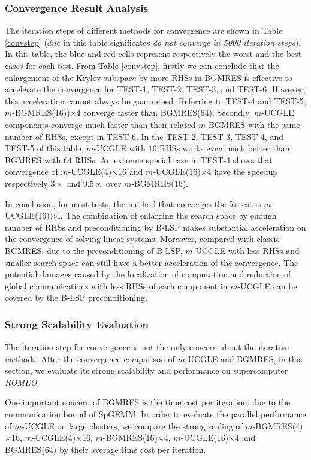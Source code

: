 \subsubsection{Convergence Result Analysis}

The iteration steps of different methods for convergence are shown in Table \ref{convstep} ($dnc$ in this table significates \textit{do not converge in 5000 iteration steps}). In this table, the blue and red cells represent respectively the worst and the best cases for each test. From Table \ref{convstep}, firstly we can conclude that the enlargement of the Krylov subspace by more RHSs in BGMRES is effective to accelerate the convergence for TEST-1, TEST-2, TEST-3, and TEST-6. However, this acceleration cannot always be guaranteed. Referring to TEST-4 and TEST-5, $m$-BGMRES(16))$\times4$ converge faster than BGMRES(64). Secondly, $m$-UCGLE components converge much faster than their related $m$-BGMRES with the same number of RHSs, except in TEST-6. In the TEST-2, TEST-3, TEST-4, and TEST-5 of this table, $m$-UCGLE with $16$ RHSs works even much better than BGMRES with $64$ RHSs. An extreme special case in TEST-4 shows that convergence of $m$-UCGLE(4)$\times16$ and $m$-UCGLE(16)$\times4$ have the speedup respectively $3\times$ and $9.5 \times$ over $m$-BGMRES(16).  

In conclusion, for most tests, the method that converges the fastest is $m$-UCGLE(16)$\times4$. The combination of enlarging the search space by enough number of RHSs and preconditioning by B-LSP makes substantial acceleration on the convergence of solving linear systems. Moreover, compared with classic BGMRES, due to the preconditioning of B-LSP, $m$-UCGLE with less RHSs and smaller search space can still have a better acceleration of the convergence. The potential damages caused by the localization of computation and reduction of global communications with less RHSs of each component in $m$-UCGLE can be covered by the B-LSP preconditioning.

\subsubsection{Strong Scalability Evaluation}

The iteration step for convergence is not the only concern about the iterative methods. After the convergence comparison of $m$-UCGLE and BGMRES, in this section, we evaluate its strong scalability and performance on supercomputer \textit{ROMEO}.

One important concern of BGMRES is the time cost per iteration, due to the communication bound of SpGEMM. In order to evaluate the parallel performance of $m$-UCGLE on large clusters, we compare the strong scaling of $m$-BGMRES(4)$\times 16$, $m$-UCGLE(4)$\times 16$, $m$-BGMRES(16)$\times 4$, $m$-UCGLE(16)$\times 4$ and BGMRES(64) by their average time cost per iteration. 

